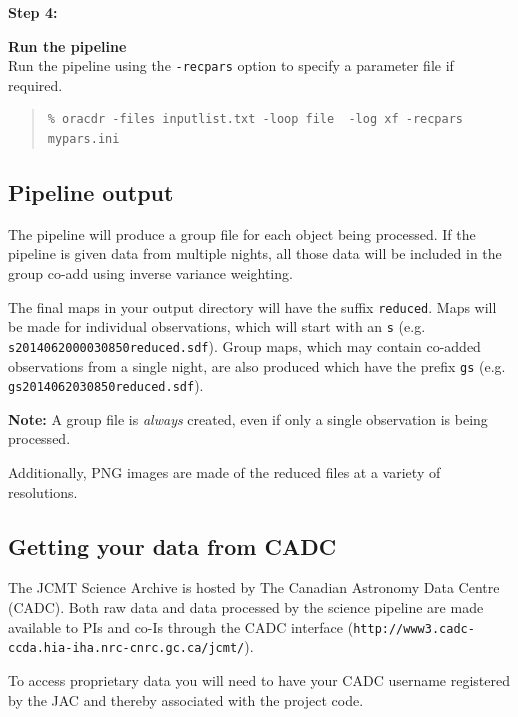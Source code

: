 \documentclass[twoside,11pt]{article}
\newcommand{\xlabel}[1]{}
\renewcommand{\_}{\texttt{\symbol{95}}}
\newenvironment{myquote}{
   \color{MidnightBlue}\begin{quote}\begin{small}}{
   \end{small}\end{quote}
}
\newcommand{\file}[1]{\texttt{#1}}
\newcommand{\url}[1]{\texttt{#1}}
\renewenvironment{myquote}{
      \begin{quote}\begin{small}}{
      \end{small}\end{quote}
   }
\begin{document}
\begin{minipage}[t]{0.12\linewidth}
\textbf{Step 4:}
\end{minipage}
\begin{minipage}[t]{0.87\linewidth}
\textbf{Run the pipeline} \\Run the pipeline using the
\texttt{-recpars} option to specify a parameter file if required.
\begin{myquote}
\begin{verbatim}
% oracdr -files inputlist.txt -loop file  -log xf -recpars mypars.ini
\end{verbatim}
\end{myquote}
\end{minipage}


\subsection{\xlabel{pl_output}Pipeline output}

The pipeline will produce a group file for each object being
processed. If the pipeline is given data from multiple nights, all
those data will be included in the group co-add using inverse variance
weighting.

The final maps in your output directory will have the suffix
\file{\_reduced}. Maps will be made for individual observations,
which will start with an \file{s} (e.g.
\file{s20140620\_00030\_850\_reduced.sdf}). Group maps, which may contain
co-added observations from a single night, are also produced which
have the prefix \file{gs} (e.g. \file{gs20140620\_30\_850\_reduced.sdf}).

\textbf{Note:} A group file is \emph{always} created, even if only a single
observation is being processed.

Additionally, PNG images are made of the reduced files at a variety of
resolutions.

\subsection{\xlabel{cadc}Getting your data from CADC}

The JCMT Science Archive is hosted by The Canadian Astronomy Data
Centre (CADC). Both raw data and data processed by the science pipeline
are made available to PIs and co-Is through the CADC interface
(\url{http://www3.cadc-ccda.hia-iha.nrc-cnrc.gc.ca/jcmt/}).

To access proprietary data you will need to have your CADC username
registered by the JAC and thereby associated with the project code.
\end{document}
